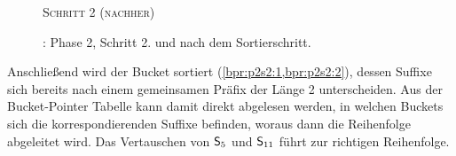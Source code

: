 \begin{figure}[H]
    {\centering\begin{minipage}{\textwidth}
        {\large \textsc{Schritt 2 (nachher)}}\par\medskip
    \end{minipage}}
    \caption[\bpr: Phase 2, Schritt 2 (nachher)]{\bpr: Phase 2, Schritt 2. \sa und \bptr nach dem Sortierschritt.}
    \label{bpr:p2s2:2}
\end{figure}
Anschließend wird der Bucket  sortiert (\cref{bpr:p2s2:1,bpr:p2s2:2}), dessen Suffixe sich bereits nach einem gemeinsamen Präfix der Länge 2 unterscheiden. Aus der Bucket-Pointer Tabelle kann damit direkt abgelesen werden, in welchen Buckets sich die korrespondierenden Suffixe befinden, woraus dann die Reihenfolge abgeleitet wird. Das Vertauschen von \(\mathsf{S}_{5}\) und \(\mathsf{S}_{11}\) führt zur richtigen Reihenfolge.\par
